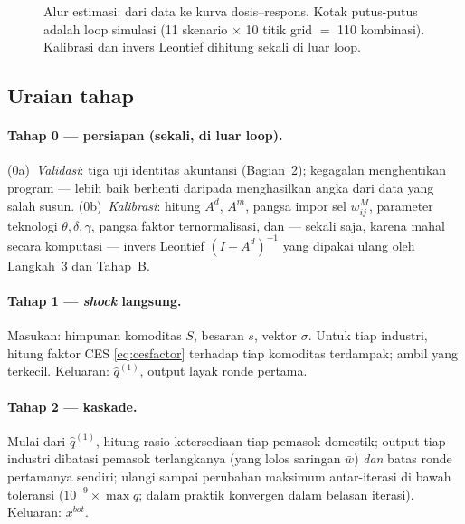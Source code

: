 \documentclass[11pt,a4paper]{article}
\newcommand{\en}[1]{\textit{#1}}   %
\begin{document}
\begin{figure}[p]
\caption{Alur estimasi: dari data ke kurva dosis--respons. Kotak putus-putus
adalah loop simulasi (11 skenario $\times$ 10 titik grid $=$ 110 kombinasi).
Kalibrasi dan invers Leontief dihitung sekali di luar loop.}
\label{fig:flow}
\end{figure}

\subsection{Uraian tahap}

\paragraph{Tahap 0 --- persiapan (sekali, di luar loop).}
(0a)~\emph{Validasi}: tiga uji identitas akuntansi (Bagian~2); kegagalan
menghentikan program --- lebih baik berhenti daripada menghasilkan angka
dari data yang salah susun. (0b)~\emph{Kalibrasi}: hitung $A^d$, $A^m$,
pangsa impor sel $w^M_{ij}$, parameter teknologi $\theta, \delta, \gamma$,
pangsa faktor ternormalisasi, dan --- sekali saja, karena mahal secara
komputasi --- invers Leontief $(I - A^d)^{-1}$ yang dipakai ulang oleh
Langkah~3 dan Tahap~B.

\paragraph{Tahap 1 --- \en{shock} langsung.} Masukan: himpunan komoditas
$S$, besaran $s$, vektor $\sigma$. Untuk tiap industri, hitung faktor CES
\eqref{eq:cesfactor} terhadap tiap komoditas terdampak; ambil yang
terkecil. Keluaran: $\hat q^{(1)}$, output layak ronde pertama.

\paragraph{Tahap 2 --- kaskade.} Mulai dari $\hat q^{(1)}$, hitung rasio
ketersediaan tiap pemasok domestik; output tiap industri dibatasi pemasok
terlangkanya (yang lolos saringan $\bar w$) \emph{dan} batas ronde
pertamanya sendiri; ulangi sampai perubahan maksimum antar-iterasi di bawah
toleransi ($10^{-9} \times \max q$; dalam praktik konvergen dalam belasan
iterasi). Keluaran: $x^{bot}$.
\end{document}
